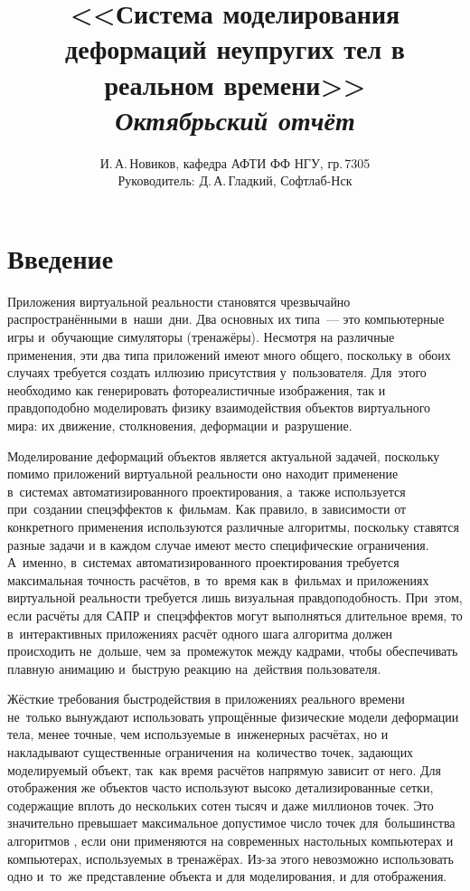 \documentclass[a4paper,11pt]{report}
\author{И.\,А.\,Новиков, кафедра АФТИ ФФ НГУ, гр.\,7305\\ Руководитель: Д.\,А.\,Гладкий, Софтлаб-Нск}
\title{<<Система моделирования деформаций неупругих тел в реальном времени>>\\\itshape Октябрьский отчёт}
\begin{document}
  \maketitle
  \tableofcontents
  \chapter*{Введение}

    Приложения виртуальной реальности становятся чрезвычайно распространёнными в~наши~дни.  Два
    основных их типа~--- это компьютерные игры и~обучающие симуляторы (тренажёры). Несмотря на
    различные применения, эти два типа приложений имеют много общего, поскольку в~обоих случаях
    требуется создать иллюзию присутствия у~пользователя. Для~этого необходимо как генерировать
    фотореалистичные изображения, так и правдоподобно моделировать физику взаимодействия объектов
    виртуального мира: их движение, столкновения, деформации и~разрушение.

    Моделирование деформаций объектов является актуальной задачей, поскольку помимо приложений
    виртуальной реальности оно находит применение в~системах автоматизированного проектирования, а~также используется
    при~создании спецэффектов к~фильмам.  Как правило, в зависимости от конкретного применения
    используются различные алгоритмы, поскольку ставятся разные задачи и в каждом случае имеют место
    специфические ограничения. А~именно, в~системах автоматизированного проектирования требуется
    максимальная точность расчётов, в~то~время как в~фильмах и приложениях виртуальной реальности
    требуется лишь визуальная правдоподобность. При~этом, если расчёты для САПР и~спецэффектов могут
    выполняться длительное время, то в~интерактивных приложениях расчёт одного шага алгоритма должен
    происходить не~дольше, чем за~промежуток между кадрами, чтобы обеспечивать плавную анимацию
    и~быструю реакцию на~действия пользователя.

    Жёсткие требования быстродействия в приложениях реального времени не~только вынуждают
    использовать упрощённые физические модели деформации тела, менее точные, чем используемые
    в~инженерных расчётах, но и накладывают существенные ограничения на~количество точек, задающих
    моделируемый объект, так~как время расчётов напрямую зависит от него. Для отображения же
    объектов часто используют высоко детализированные сетки, содержащие вплоть до нескольких
    сотен тысяч и даже миллионов точек. Это значительно превышает максимальное допустимое число точек для~большинства
    алгоритмов \cite{mueller-stable, mueller-meshless, chang-crash}, если они применяются на
    современных настольных компьютерах и компьютерах, используемых в тренажёрах. Из-за этого
    невозможно использовать одно и~то~же представление объекта и для моделирования, и для
    отображения.
\end{document}
